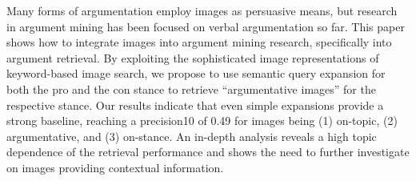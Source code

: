 Many forms of argumentation employ images as persuasive means, but research in argument mining has been focused on verbal argumentation so far. This paper shows how to integrate images into argument mining research, specifically into argument retrieval. By exploiting the sophisticated image representations of keyword-based image search, we propose to use semantic query expansion for both the pro and the con stance to retrieve ``argumentative images'' for the respective stance. Our results indicate that even simple expansions provide a strong baseline, reaching a precision\@10 of 0.49 for images being (1) on-topic, (2) argumentative, and (3) on-stance. An in-depth analysis reveals a high topic dependence of the retrieval performance and shows the need to further investigate on images providing contextual information.
